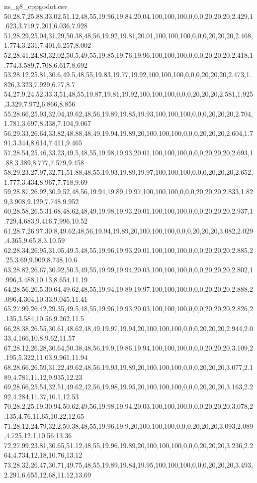 \begin{filecontents*}[overwrite]{ns_g8_cppgodot.csv}
50,28.7,25.88,33.02,51.12,48,55,19.96,19.84,20.04,100,100,100,0,0,0,20,20,20,2.429,1.623,3.719,7.201,6.036,7.928
51,28.29,25.04,31.29,50.38,48,56,19.92,19.81,20.01,100,100,100,0,0,0,20,20,20,2.468,1.774,3.231,7.401,6.257,8.002
52,28.41,24.83,32.02,50.5,49,55,19.85,19.76,19.96,100,100,100,0,0,0,20,20,20,2.418,1.774,3.589,7.708,6.617,8.692
53,28.12,25.81,30.6,49.5,48,55,19.83,19.77,19.92,100,100,100,0,0,0,20,20,20,2.473,1.826,3.323,7.929,6.77,8.7
54,27.9,24.52,33.3,51,48,55,19.87,19.81,19.92,100,100,100,0,0,0,20,20,20,2.581,1.925,3.329,7.972,6.866,8.856
55,28.66,25.93,32.04,49.62,48,56,19.89,19.85,19.93,100,100,100,0,0,0,20,20,20,2.704,1.781,3.697,8.338,7.104,9.067
56,29.33,26.64,33.82,48.88,48,49,19.94,19.89,20,100,100,100,0,0,0,20,20,20,2.604,1.791,3.344,8.614,7.411,9.465
57,28.54,25.46,33.23,49.5,48,55,19.98,19.93,20.01,100,100,100,0,0,0,20,20,20,2.693,1.88,3.389,8.777,7.579,9.458
58,29.23,27.97,32.71,51.88,48,55,19.93,19.89,19.97,100,100,100,0,0,0,20,20,20,2.652,1.777,3.434,8.967,7.718,9.69
59,28.87,26.92,30.9,52,48,56,19.94,19.89,19.97,100,100,100,0,0,0,20,20,20,2.833,1.829,3.908,9.129,7.748,9.952
60,28.58,26.5,31.68,48.62,48,49,19.98,19.93,20.01,100,100,100,0,0,0,20,20,20,2.937,1.729,4.683,9.416,7.996,10.52
61,28.7,26.97,30.8,49.62,48,56,19.94,19.89,20,100,100,100,0,0,0,20,20,20,3.082,2.029,4.365,9.65,8.3,10.59
62,28.34,26.95,31.05,49.5,48,55,19.96,19.93,20.01,100,100,100,0,0,0,20,20,20,2.885,2.25,3.69,9.909,8.748,10.6
63,28.82,26.67,30.92,50.5,49,55,19.99,19.94,20.03,100,100,100,0,0,0,20,20,20,2.802,1.996,3.488,10.13,8.654,11.19
64,28.56,26.5,30.64,49.62,48,55,19.94,19.89,19.97,100,100,100,0,0,0,20,20,20,2.888,2.096,4.304,10.33,9.045,11.41
65,27.99,26.42,29.35,49.5,48,55,19.96,19.93,20.03,100,100,100,0,0,0,20,20,20,2.826,2.135,3.584,10.56,9.262,11.5
66,28.38,26.55,30.61,48.62,48,49,19.97,19.94,20,100,100,100,0,0,0,20,20,20,2.944,2.033,4.166,10.8,9.62,11.57
67,28.12,26.28,30.64,50.38,48,56,19.9,19.86,19.94,100,100,100,0,0,0,20,20,20,3.109,2.195,5.322,11.03,9.961,11.94
68,28.66,26.59,31.22,49.62,48,56,19.93,19.89,20,100,100,100,0,0,0,20,20,20,3.077,2.189,4.781,11.12,9.935,12.23
69,28.66,25.54,32.51,49.62,42,56,19.98,19.95,20,100,100,100,0,0,0,20,20,20,3.163,2.292,4.284,11.37,10.1,12.53
70,28.2,25.19,30.94,50.62,49,56,19.98,19.94,20.03,100,100,100,0,0,0,20,20,20,3.078,2.135,4.76,11.65,10.22,12.65
71,28.12,24.79,32.2,50.38,48,55,19.96,19.9,20,100,100,100,0,0,0,20,20,20,3.093,2.089,4.725,12.1,10.56,13.36
72,27.99,23.81,30.65,51.12,48,55,19.96,19.89,20,100,100,100,0,0,0,20,20,20,3.236,2.264,4.734,12.18,10.76,13.12
73,28.32,26.47,30.71,49.75,48,55,19.89,19.84,19.95,100,100,100,0,0,0,20,20,20,3.493,2.291,6.655,12.68,11.12,13.69

\end{filecontents*}
